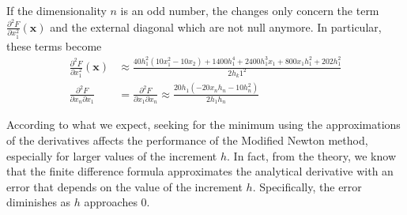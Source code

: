 If the dimensionality $n$ is an odd number, the changes only concern the term  $\frac{\partial^2 F}{\partial x_1^2} (\mathbf{x})$ and the external diagonal which are not null anymore. In particular, these terms become
\begin{align*}
    \frac{\partial^2 F}{\partial x_1^2} (\mathbf{x}) & \approx\frac{40h_1^2 (10x_1^2 - 10x_{2}) + 1400 h_1^4 + 2400h_1^3 x_1 + 800 x_1 h_1^2 + 202h_1^2 }{2 h_k1^2} \\
    \frac{\partial^2 F}{ \partial x_n \partial x_1} & = \frac{\partial^2 F}{ \partial x_1 \partial x_n} \approx \frac{20h_1(-20x_n h_n - 10h_n^2 )}{2h_1 h_n}
\end{align*}


According to what we expect, seeking for the minimum using the approximations of the derivatives affects the performance of the Modified Newton method, especially for larger values of the increment $h$. 
In fact, from the theory, we know that the finite difference formula approximates the analytical derivative with an error that depends on the value of the increment $h$. Specifically, the error diminishes as $h$ approaches $0$.

